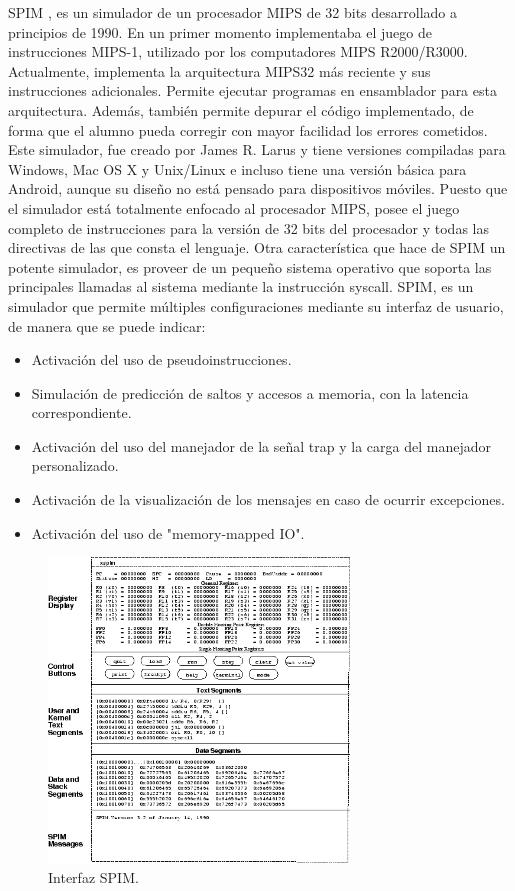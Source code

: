 SPIM \cite{larus1990spim}, es un simulador de un procesador MIPS de 32 bits desarrollado a principios de 1990. En un primer momento implementaba el juego de instrucciones MIPS-1, utilizado por los computadores MIPS R2000/R3000. Actualmente, implementa la arquitectura MIPS32 más reciente y sus instrucciones adicionales. Permite ejecutar programas en ensamblador para esta arquitectura. Además, también permite depurar el código implementado, de forma que el alumno pueda corregir con mayor facilidad los errores cometidos. Este simulador, fue creado por James R. Larus y tiene versiones compiladas para Windows, Mac OS X y Unix/Linux e incluso tiene una versión básica para Android, aunque su diseño no está pensado para dispositivos móviles. Puesto que el simulador está totalmente enfocado al procesador MIPS, posee el juego completo de instrucciones para la versión de 32 bits del procesador y todas las directivas de las que consta el lenguaje. Otra característica que hace de SPIM un potente simulador, es proveer de un pequeño sistema operativo que soporta las principales llamadas al sistema mediante la instrucción syscall. SPIM, es un simulador que permite múltiples configuraciones mediante su interfaz de usuario, de manera que se puede indicar:

\begin{itemize}

\item Activación del uso de pseudoinstrucciones.

\item Simulación de predicción de saltos y accesos a memoria, con la latencia correspondiente.

\item Activación del uso del manejador de la señal trap y la carga del manejador personalizado.

\item Activación de la visualización de los mensajes en caso de ocurrir excepciones.

\item Activación del uso de "memory-mapped IO".

\end{itemize}

\begin{figure}[htbp]
 	\centering
 	\includegraphics[width=8cm]{figures/spim_figure}
 	\caption{Interfaz SPIM.}
	\label{fig:spim_figure}
\end{figure}

